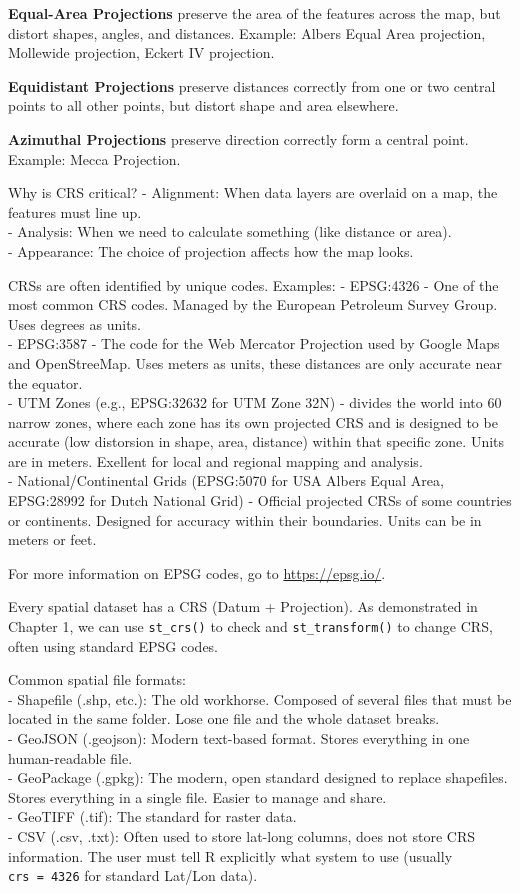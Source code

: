 \documentclass[
]{article}
\begin{document}
\textbf{Equal-Area Projections} preserve the area of the features across
the map, but distort shapes, angles, and distances. Example: Albers
Equal Area projection, Mollewide projection, Eckert IV projection.

\textbf{Equidistant Projections} preserve distances correctly from one
or two central points to all other points, but distort shape and area
elsewhere.

\textbf{Azimuthal Projections} preserve direction correctly form a
central point. Example: Mecca Projection.

Why is CRS critical? - Alignment: When data layers are overlaid on a
map, the features must line up.\\
- Analysis: When we need to calculate something (like distance or
area).\\
- Appearance: The choice of projection affects how the map looks.

CRSs are often identified by unique codes. Examples: - EPSG:4326 - One
of the most common CRS codes. Managed by the European Petroleum Survey
Group. Uses degrees as units.\\
- EPSG:3587 - The code for the Web Mercator Projection used by Google
Maps and OpenStreeMap. Uses meters as units, these distances are only
accurate near the equator.\\
- UTM Zones (e.g., EPSG:32632 for UTM Zone 32N) - divides the world into
60 narrow zones, where each zone has its own projected CRS and is
designed to be accurate (low distorsion in shape, area, distance) within
that specific zone. Units are in meters. Exellent for local and regional
mapping and analysis.\\
- National/Continental Grids (EPSG:5070 for USA Albers Equal Area,
EPSG:28992 for Dutch National Grid) - Official projected CRSs of some
countries or continents. Designed for accuracy within their boundaries.
Units can be in meters or feet.

For more information on EPSG codes, go to \url{https://epsg.io/}.

Every spatial dataset has a CRS (Datum + Projection). As demonstrated in
Chapter 1, we can use \texttt{st\_crs()} to check and
\texttt{st\_transform()} to change CRS, often using standard EPSG codes.

Common spatial file formats:\\
- Shapefile (.shp, etc.): The old workhorse. Composed of several files
that must be located in the same folder. Lose one file and the whole
dataset breaks.\\
- GeoJSON (.geojson): Modern text-based format. Stores everything in one
human-readable file.\\
- GeoPackage (.gpkg): The modern, open standard designed to replace
shapefiles. Stores everything in a single file. Easier to manage and
share.\\
- GeoTIFF (.tif): The standard for raster data.\\
- CSV (.csv, .txt): Often used to store lat-long columns, does not store
CRS information. The user must tell R explicitly what system to use
(usually \texttt{crs\ =\ 4326} for standard Lat/Lon data).
\end{document}

